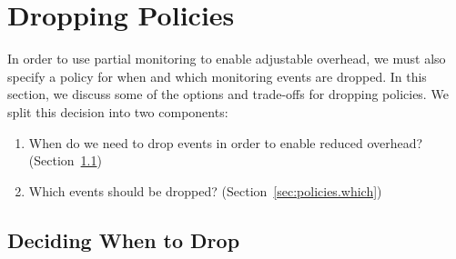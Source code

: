 \section{Dropping Policies} \label{sec:policies}

In order to use partial monitoring to enable adjustable overhead, we must also
specify a policy for when and which monitoring events are dropped. In this
section, we discuss some of the options and trade-offs for dropping policies.
We split this decision into two components: \begin{enumerate} \item When do we
need to drop events in order to enable reduced overhead?
(Section~\ref{sec:policies.when}) \item Which events should be dropped?
(Section~\ref{sec:policies.which}) \end{enumerate}


\subsection{Deciding When to Drop} \label{sec:policies.when}

